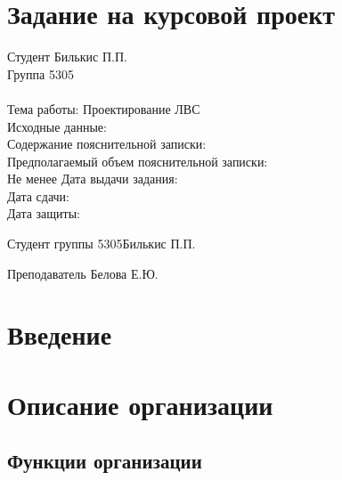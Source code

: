 \documentclass[a4paper,14pt,russian]{article}
\newcommand{\theme}{Проектирование ЛВС}
\newcommand{\groupnumber}{5305}
\newcommand{\studentname}{Билькис П.П.}
\newcommand{\teachername}{Белова Е.Ю.}
\begin{document}


\section*{Задание на курсовой проект}

Студент \studentname\\
Группа \groupnumber\\\\
Тема работы: \theme\\
Исходные данные:\\
Содержание пояснительной записки:\\
Предполагаемый объем пояснительной записки:\\
Не менее \pageref{LastPage}
Дата выдачи задания:\\
Дата сдачи:\\
Дата защиты:\\

\vfill


Студент группы \groupnumber \hfill \studentname


Преподаватель \hfill \teachername


\clearpage

\begin{abstract}

\end{abstract}


\begin{abstract}

\end{abstract}

\clearpage

\tableofcontents

\section*{Введение}

\section{Описание организации}

\subsection{Функции организации}

\end{document}
